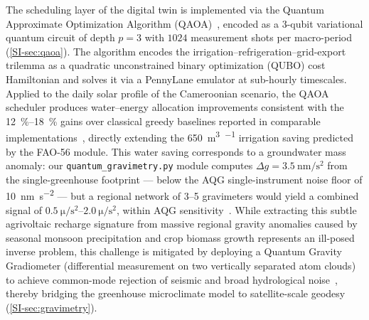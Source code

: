 \documentclass[onecolumn,a4paper,12pt]{article}
\begin{document}
The scheduling layer of the digital twin is implemented via the Quantum Approximate Optimization Algorithm (QAOA)~\cite{Farhi2014,AlSagri2025}, encoded as a 3-qubit variational quantum circuit of depth $p=3$ with $1024$ measurement shots per macro-period (\cref{SI-sec:qaoa}). The algorithm encodes the irrigation--refrigeration--grid-export trilemma as a quadratic unconstrained binary optimization (QUBO) cost Hamiltonian and solves it via a PennyLane emulator at sub-hourly timescales. Applied to the daily solar profile of the Cameroonian scenario, the QAOA scheduler produces water--energy allocation improvements consistent with the \qtyrange{12}{18}{\percent} gains over classical greedy baselines reported in comparable implementations~\cite{AlSagri2025}, directly extending the \qty{650}{\m\cubed\per\yr} irrigation saving predicted by the FAO-56 module. This water saving corresponds to a groundwater mass anomaly: our \texttt{quantum\_gravimetry.py} module computes $\Delta g = \qty{3.5}{\nm\per\s\squared}$ from the single-greenhouse footprint --- below the AQG single-instrument noise floor of \qty{10}{\nm\per\s\squared} --- but a regional network of 3--5 gravimeters would yield a combined signal of $\qtyrange{0.5}{2.0}{\micro\per\s\squared}$, within AQG sensitivity~\cite{Stray2022,Menoret2018}. While extracting this subtle agrivoltaic recharge signature from massive regional gravity anomalies caused by seasonal monsoon precipitation and crop biomass growth represents an ill-posed inverse problem, this challenge is mitigated by deploying a Quantum Gravity Gradiometer (differential measurement on two vertically separated atom clouds) to achieve common-mode rejection of seismic and broad hydrological noise~\cite{Stray2022}, thereby bridging the greenhouse microclimate model to satellite-scale geodesy (\cref{SI-sec:gravimetry}).
\end{document}
